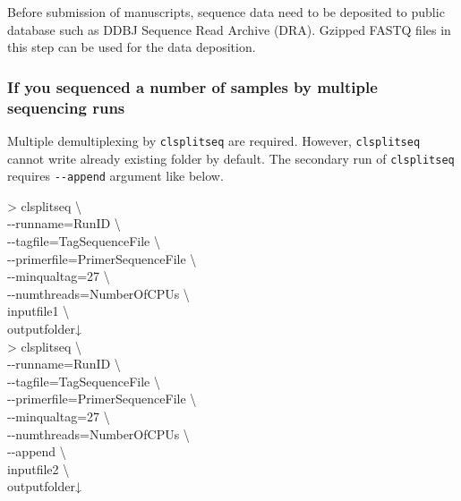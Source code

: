 \documentclass[titlepage,10pt,a4paper,english]{jsbook}
\newenvironment{cmd}{\begin{oframed}\raggedright\ttfamily\footnotesize\setlength{\baselineskip}{1.4em}}{\end{oframed}\vspace{-1em}}
\begin{document}
Before submission of manuscripts, sequence data need to be deposited to public database such as DDBJ Sequence Read Archive (DRA).
Gzipped FASTQ files in this step can be used for the data deposition.

\subsubsection{If you sequenced a number of samples by multiple sequencing runs}
Multiple demultiplexing by \texttt{clsplitseq} are required.
However, \texttt{clsplitseq} cannot write already existing folder by default.
The secondary run of \texttt{clsplitseq} requires \texttt{{-}{-}append} argument like below.
\begin{cmd}
{\textgreater} clsplitseq {\textbackslash}\\
{-}{-}runname=RunID {\textbackslash}\\
{-}{-}tagfile=TagSequenceFile {\textbackslash}\\
{-}{-}primerfile=PrimerSequenceFile {\textbackslash}\\
{-}{-}minqualtag=27 {\textbackslash}\\
{-}{-}numthreads=NumberOfCPUs {\textbackslash}\\
inputfile1 {\textbackslash}\\
outputfolder↓\\
{\textgreater} clsplitseq {\textbackslash}\\
{-}{-}runname=RunID {\textbackslash}\\
{-}{-}tagfile=TagSequenceFile {\textbackslash}\\
{-}{-}primerfile=PrimerSequenceFile {\textbackslash}\\
{-}{-}minqualtag=27 {\textbackslash}\\
{-}{-}numthreads=NumberOfCPUs {\textbackslash}\\
{-}{-}append {\textbackslash}\\
inputfile2 {\textbackslash}\\
outputfolder↓
\end{cmd}
\end{document}
